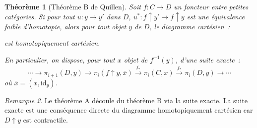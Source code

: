 \documentclass{amsart}
\theoremstyle{plain}
\newtheorem{theo}{Théorème}[section]
\theoremstyle{definition}
\theoremstyle{remark}
\newtheorem{rem}[theo]{Remarque}
\newcommand{\id}{\mathrm{id}}
\newcommand{\ra}{\rightarrow}
\begin{document}
\begin{theo}[Théorème B de Quillen]\label{theoremeB}
  Soit $f:C\ra D$ un foncteur entre petites catégories. Si pour tout $u:y\ra y'$ dans $D$, $u^*:f\uparrow y'\ra f\uparrow y$
  est une équivalence faible d'homotopie, alors pour tout objet $y$ de $D$, le diagramme cartésien~:
  \begin{center}
  \end{center}
  est homotopiquement cartésien.

  En particulier, on dispose, pour tout $x$ objet de $f^{-1}(y)$, d'une suite exacte~:
  $$\dotsb\ra \pi_{i+1}(D,y)\ra \pi_{i}(f\uparrow y,\bar{x})\overset{j_*}{\ra} \pi_{i}(C,x)\overset{f_*}{\ra} \pi_{i}(D,y)\ra \dotsb$$
  où $\bar{x}=(x,\id_y)$.
\end{theo}

\begin{rem}
  Le théorème A découle du théorème B via la suite exacte. La suite exacte est une conséquence directe du diagramme homotopiquement
  cartésien car $D\uparrow y$ est contractile.
\end{rem}
\end{document}

